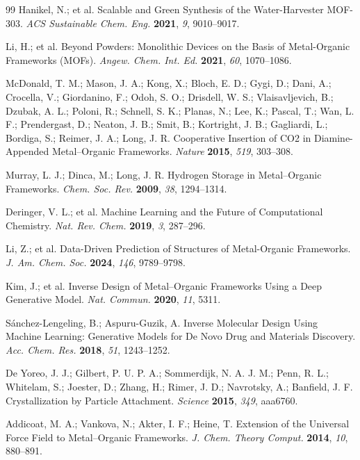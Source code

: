 \documentclass[12pt,a4paper]{article}
\begin{document}
\begin{thebibliography}{99}
 Hanikel, N.; et al. Scalable and Green Synthesis of the Water-Harvester MOF-303. \textit{ACS Sustainable Chem. Eng.} \textbf{2021}, \textit{9}, 9010–9017.

 Li, H.; et al. Beyond Powders: Monolithic Devices on the Basis of Metal-Organic Frameworks (MOFs). \textit{Angew. Chem. Int. Ed.} \textbf{2021}, \textit{60}, 1070–1086.

 McDonald, T. M.; Mason, J. A.; Kong, X.; Bloch, E. D.; Gygi, D.; Dani, A.; Crocella, V.; Giordanino, F.; Odoh, S. O.; Drisdell, W. S.; Vlaisavljevich, B.; Dzubak, A. L.; Poloni, R.; Schnell, S. K.; Planas, N.; Lee, K.; Pascal, T.; Wan, L. F.; Prendergast, D.; Neaton, J. B.; Smit, B.; Kortright, J. B.; Gagliardi, L.; Bordiga, S.; Reimer, J. A.; Long, J. R. Cooperative Insertion of CO2 in Diamine-Appended Metal--Organic Frameworks. \textit{Nature} \textbf{2015}, \textit{519}, 303--308.

 Murray, L. J.; Dinca, M.; Long, J. R. Hydrogen Storage in Metal--Organic Frameworks. \textit{Chem. Soc. Rev.} \textbf{2009}, \textit{38}, 1294--1314.

 Deringer, V. L.; et al. Machine Learning and the Future of Computational Chemistry. \textit{Nat. Rev. Chem.} \textbf{2019}, \textit{3}, 287–296.

 Li, Z.; et al. Data-Driven Prediction of Structures of Metal-Organic Frameworks. \textit{J. Am. Chem. Soc.} \textbf{2024}, \textit{146}, 9789–9798.

 Kim, J.; et al. Inverse Design of Metal–Organic Frameworks Using a Deep Generative Model. \textit{Nat. Commun.} \textbf{2020}, \textit{11}, 5311.

 Sánchez-Lengeling, B.; Aspuru-Guzik, A. Inverse Molecular Design Using Machine Learning: Generative Models for De Novo Drug and Materials Discovery. \textit{Acc. Chem. Res.} \textbf{2018}, \textit{51}, 1243–1252.

 De Yoreo, J. J.; Gilbert, P. U. P. A.; Sommerdijk, N. A. J. M.; Penn, R. L.; Whitelam, S.; Joester, D.; Zhang, H.; Rimer, J. D.; Navrotsky, A.; Banfield, J. F. Crystallization by Particle Attachment. \textit{Science} \textbf{2015}, \textit{349}, aaa6760.

 Addicoat, M. A.; Vankova, N.; Akter, I. F.; Heine, T. Extension of the Universal Force Field to Metal--Organic Frameworks. \textit{J. Chem. Theory Comput.} \textbf{2014}, \textit{10}, 880--891.


\end{thebibliography}
\end{document}
